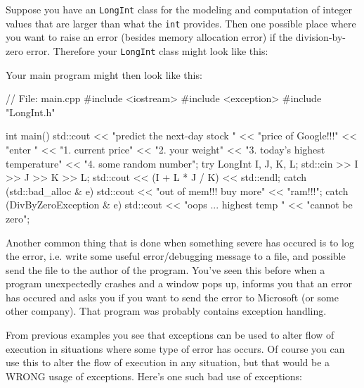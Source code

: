 \newpage{}

Suppose you have an \texttt{LongInt} class for the modeling and
computation of integer values that are larger than what the \texttt{int}
provides. Then one possible place where you want to raise an error
(besides memory allocation error) if the division-by-zero error.
Therefore your \texttt{LongInt} class might look like this:


Your main program might then look like this:

\begin{console}
// File: main.cpp
#include <iostream>
#include <exception>
#include "LongInt.h"

int main()
{   
    std::cout << "predict the next-day stock "
    << "price of Google!!!\n"
    << "enter \n"
    << "1. current price\n"
    << "2. your weight\n"
    << "3. today's highest temperature\n"
    << "4. some random number\n";
    try
    {
        LongInt I, J, K, L;
        std::cin >> I >> J >> K >> L;
        std::cout << (I + L * J / K) << std::endl;
    }
    catch (std::bad_alloc & e)
    {
        std::cout << "out of mem!!! buy more"
                  << "ram!!!\n";
    }
    catch (DivByZeroException & e)
    {
        std::cout << "oops ... highest temp "
        << "cannot be zero\n";
    }
}
\end{console}

Another common thing that is done when something severe has occured is
to log the error, i.e. write some useful error/debugging message to a
file, and possible send the file to the author of the program.
You've seen this before when a program unexpectedly
crashes and a window pops up, informs you that an error has occured and
asks you if you want to send the error to Microsoft (or some other
company). That program was probably contains exception handling.

\newpage{}

From previous examples you see that exceptions can be used to alter flow
of execution in situations where some type of error has occurs. Of
course you can use this to alter the flow of execution in any situation,
but that would be a WRONG usage of exceptions. Here's
one such bad use of exceptions:

